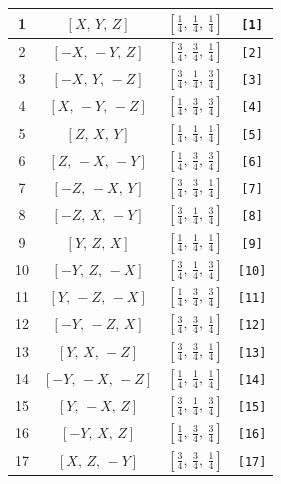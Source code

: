 \documentclass[fleqn,8pt]{jsarticle}
\begin{document}
\begin{longtable}{cccc}
1 & $\left[ X,\, Y,\, Z \right]$ & $\left[ \frac{1}{4},\, \frac{1}{4},\, \frac{1}{4} \right]$ & {\tt [1]} \\ \hline
2 & $\left[ - X,\, - Y,\, Z \right]$ & $\left[ \frac{3}{4},\, \frac{3}{4},\, \frac{1}{4} \right]$ & {\tt [2]} \\ \hline
3 & $\left[ - X,\, Y,\, - Z \right]$ & $\left[ \frac{3}{4},\, \frac{1}{4},\, \frac{3}{4} \right]$ & {\tt [3]} \\ \hline
4 & $\left[ X,\, - Y,\, - Z \right]$ & $\left[ \frac{1}{4},\, \frac{3}{4},\, \frac{3}{4} \right]$ & {\tt [4]} \\ \hline
5 & $\left[ Z,\, X,\, Y \right]$ & $\left[ \frac{1}{4},\, \frac{1}{4},\, \frac{1}{4} \right]$ & {\tt [5]} \\ \hline
6 & $\left[ Z,\, - X,\, - Y \right]$ & $\left[ \frac{1}{4},\, \frac{3}{4},\, \frac{3}{4} \right]$ & {\tt [6]} \\ \hline
7 & $\left[ - Z,\, - X,\, Y \right]$ & $\left[ \frac{3}{4},\, \frac{3}{4},\, \frac{1}{4} \right]$ & {\tt [7]} \\ \hline
8 & $\left[ - Z,\, X,\, - Y \right]$ & $\left[ \frac{3}{4},\, \frac{1}{4},\, \frac{3}{4} \right]$ & {\tt [8]} \\ \hline
9 & $\left[ Y,\, Z,\, X \right]$ & $\left[ \frac{1}{4},\, \frac{1}{4},\, \frac{1}{4} \right]$ & {\tt [9]} \\ \hline
10 & $\left[ - Y,\, Z,\, - X \right]$ & $\left[ \frac{3}{4},\, \frac{1}{4},\, \frac{3}{4} \right]$ & {\tt [10]} \\ \hline
11 & $\left[ Y,\, - Z,\, - X \right]$ & $\left[ \frac{1}{4},\, \frac{3}{4},\, \frac{3}{4} \right]$ & {\tt [11]} \\ \hline
12 & $\left[ - Y,\, - Z,\, X \right]$ & $\left[ \frac{3}{4},\, \frac{3}{4},\, \frac{1}{4} \right]$ & {\tt [12]} \\ \hline
13 & $\left[ Y,\, X,\, - Z \right]$ & $\left[ \frac{3}{4},\, \frac{3}{4},\, \frac{1}{4} \right]$ & {\tt [13]} \\ \hline
14 & $\left[ - Y,\, - X,\, - Z \right]$ & $\left[ \frac{1}{4},\, \frac{1}{4},\, \frac{1}{4} \right]$ & {\tt [14]} \\ \hline
15 & $\left[ Y,\, - X,\, Z \right]$ & $\left[ \frac{3}{4},\, \frac{1}{4},\, \frac{3}{4} \right]$ & {\tt [15]} \\ \hline
16 & $\left[ - Y,\, X,\, Z \right]$ & $\left[ \frac{1}{4},\, \frac{3}{4},\, \frac{3}{4} \right]$ & {\tt [16]} \\ \hline
17 & $\left[ X,\, Z,\, - Y \right]$ & $\left[ \frac{3}{4},\, \frac{3}{4},\, \frac{1}{4} \right]$ & {\tt [17]} \\ \hline

\end{longtable}
\end{document}
